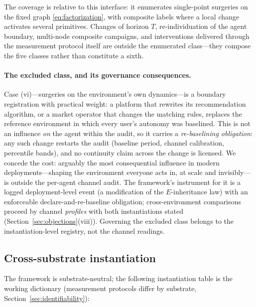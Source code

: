 The coverage is relative to this interface: it enumerates single-point
surgeries on the fixed graph \eqref{eq:factorization}, with composite labels
where a local change activates several primitives. Changes of horizon
$T$, re-individuation of the agent boundary, multi-node composite campaigns,
and interventions delivered through the measurement protocol itself are
outside the enumerated class---they compose the five classes rather than
constitute a sixth.

\paragraph{The excluded class, and its governance consequences.}
Case (vi)---surgeries on the environment's own dynamics---is a boundary
registration with practical weight: a platform that rewrites its recommendation
algorithm, or a market operator that changes the matching rules, replaces the
reference environment in which every user's autonomy was baselined. This is
not an influence \emph{on} the agent within the audit, so it carries a
\emph{re-baselining obligation}: any such change restarts the audit (baseline
period, channel calibration, percentile bands), and no continuity claim across
the change is licensed. We concede the cost: arguably the most consequential
influence in modern deployments---shaping the environment everyone acts in, at
scale and invisibly---is outside the per-agent channel audit. The framework's
instrument for it is a logged deployment-level event (a modification of the
$E$-inheritance law) with an enforceable declare-and-re-baseline obligation;
cross-environment comparisons proceed by channel \emph{profiles} with both
instantiations stated (Section~\ref{sec:objections}(viii)). Governing the
excluded class belongs to the instantiation-level registry, not the channel
readings.

\subsection{Cross-substrate instantiation}\label{sec:substrates}

The framework is substrate-neutral; the following instantiation table is the
working dictionary (measurement protocols differ by substrate,
Section~\ref{sec:identifiability}):


